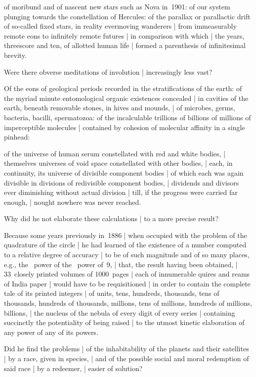 \Poetry
of moribund and of nascent new stars such as Nova in~1901:
of our system plunging towards the constellation of Hercules:
of the parallax or parallactic drift of so-called fixed stars,
in reality evermoving wanderers |
from immeasurably remote eons to infinitely remote futures |
in comparison with which |
the years, threescore and ten, of allotted human life |
formed a parenthesis of infinitesimal brevity.


Were there obverse meditations of involution |
increasingly less vast?

\Science
Of the eons of geological periods recorded in the stratifications of the earth:
of the myriad minute entomological organic existences concealed |
in cavities of the earth, beneath removable stones, in hives and mounds, |
of microbes, germs, bacteria, bacilli, spermatozoa:
of the incalculable trillions of billions of millions of imperceptible molecules |
contained by cohesion of molecular affinity in a single pinhead:

\Poetry
of the universe of human serum constellated with red and white bodies, |
themselves universes of void space constellated with other bodies, |
each, in continuity, its universe of divisible component bodies |
of which each was again divisible in divisions of redivisible component bodies, |
dividends and divisors ever diminishing without actual division |
till, if the progress were carried far enough, |
nought nowhere was never reached.


Why did he not elaborate these calculations |
to a more precise result?

\Science
Because some years previously in~1886 |
when occupied with the problem of the quadrature of the circle |
he had learned of the existence of a number
computed to a relative degree of accuracy |
to be of such magnitude and of so many places,
e.g., the ~power of the ~power of~9, |
that, the result having been obtained, |
33~closely printed volumes of 1000~pages |
each of innumerable quires and reams of India paper |
would have to be requisitioned |
in order to contain the complete tale of its printed integers |
of units, tens, hundreds, thousands, tens of thousands,
hundreds of thousands, millions, tens of millions, hundreds of millions, billions, |
the nucleus of the nebula of every digit of every series |
containing succinctly the potentiality of being raised |
to the utmost kinetic elaboration
of any power of any of its powers.


Did he find the problems |
of the inhabitability of the planets and their satellites |
by a race, given in species, |
and of the possible social and moral redemption of said race |
by a redeemer, |
easier of solution?

